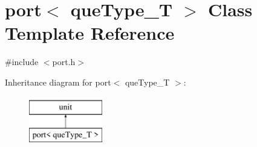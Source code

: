 \hypertarget{classport}{
\section{port$<$ queType\_\-T $>$ Class Template Reference}
\label{classport}
}


{\ttfamily \#include $<$port.h$>$}

Inheritance diagram for port$<$ queType\_\-T $>$:\begin{figure}[H]
\begin{center}
\leavevmode
\includegraphics[height=2.000000cm]{classport}
\end{center}
\end{figure}

